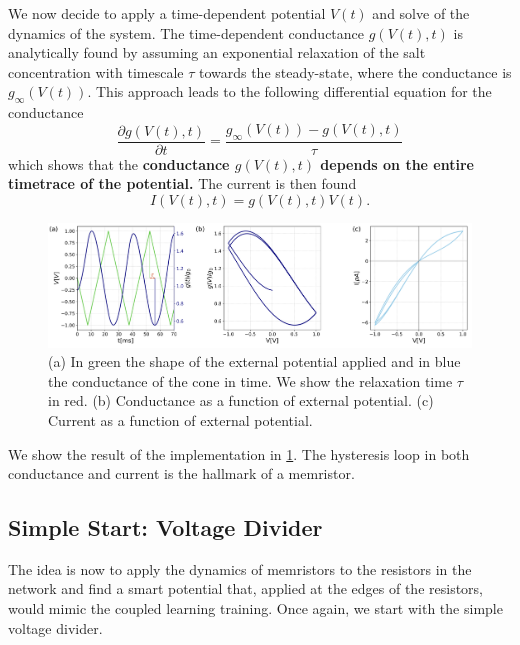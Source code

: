 \documentclass[10.5pt]{article}
\begin{document}
We now decide to apply a time-dependent potential $V(t)$ and solve of the dynamics of the system. The time-dependent conductance $g(V(t),t)$ is analytically found by assuming an exponential relaxation of the salt concentration with timescale $\tau$ towards the steady-state, where the conductance is $g_{\infty}(V(t))$. This approach leads to the following differential equation for the conductance
\begin{equation}
\frac{\partial g(V(t),t)}{\partial t} = \frac{g_{\infty}(V(t))-g(V(t),t)}{\tau}
\label{eq:cone_dynam}
\end{equation}
which shows that the \textbf{conductance $g(V(t),t)$ depends on the entire timetrace of the potential.} The current is then found 
\[
I(V(t),t)=g(V(t),t)V(t).
\]
\begin{figure}[h]
    \centering
    \includegraphics[width=1\columnwidth]{../figures_tex/cone_volt_cond_arrow.png}
    \caption{(a) In green the shape of the external potential applied and in blue the conductance of the cone in time. We show the relaxation time $\tau$ in red. (b) Conductance as a function of external potential. (c) Current as a function of external potential.}
    \label{fig:cone_steady_state}
\end{figure}
We show the result of the implementation in \cref{fig:cone_steady_state}. The hysteresis loop in both conductance and current is the hallmark of a memristor.

\newpage
\subsection{Simple Start: Voltage Divider}

The idea is now to apply the dynamics of memristors to the resistors in the network and find a smart potential that, applied at the edges of the resistors, would mimic the coupled learning training. Once again, we start with the simple voltage divider.
\end{document}

